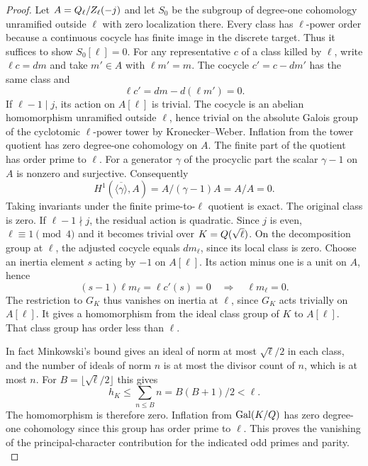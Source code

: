 \begin{proof}
Let \(A=Q_\ell/Z_\ell(-j)\) and
let \(S_0\) be the subgroup of degree-one cohomology
unramified outside \(\ell\) with zero localization there.
Every class has \(\ell\)-power order because a continuous
cocycle has finite image in the discrete target. Thus
it suffices to show \(S_0[\ell]=0\). For any representative \(c\) of a class killed by \(\ell\),
write \(\ell c=dm\) and take \(m'\in A\) with \(\ell m'=m\).
The cocycle \(c'=c-dm'\) has the same class and
\[
          \ell c'=dm-d(\ell m')=0.
\]
If \(\ell-1\mid j\), its action on \(A[\ell]\) is
trivial. The cocycle is an abelian homomorphism
unramified outside \(\ell\), hence trivial on the
absolute Galois group of the cyclotomic \(\ell\)-power
tower by Kronecker--Weber. Inflation from the tower
quotient has zero degree-one cohomology on \(A\).
The finite part of the quotient has order prime to \(\ell\).
For a generator \(\gamma\) of the procyclic part the scalar
\(\gamma-1\) on \(A\) is nonzero and surjective. Consequently
\[
 H^1(\overline{\langle\gamma\rangle},A)
 = A/(\gamma-1)A=A/A=0 .
\]
Taking invariants under the finite prime-to-\(\ell\) quotient is exact. The original
class is zero.
If \(\ell-1\nmid j\), the residual action is
quadratic. Since \(j\) is even, \(\ell\equiv1\pmod4\)
and it becomes trivial over \(K=Q(\sqrt\ell)\).
On the decomposition group at \(\ell\), the adjusted
cocycle equals \(dm_\ell\), since its local class
is zero. Choose an inertia element \(s\) acting by \(-1\) on \(A[\ell]\).
Its action minus one is a unit on \(A\), hence
\[
       (s-1)\ell m_\ell=\ell c'(s)=0\quad\Longrightarrow\quad
                  \ell m_\ell=0.
\]
The restriction to \(G_K\) thus vanishes on inertia at \(\ell\),
since \(G_K\) acts trivially on \(A[\ell]\). It gives a
homomorphism from the ideal class group of \(K\)
to \(A[\ell]\). That class group has order less
than \(\ell\).

In fact Minkowski's bound gives an
ideal of norm at most \(\sqrt\ell/2\) in each class,
and the number of ideals of norm \(n\) is at most
the divisor count of \(n\), which is at most \(n\).
For \(B=\lfloor\sqrt\ell/2\rfloor\) this gives
\[
          h_K\le \sum_{n\le B}n=B(B+1)/2<\ell.
\] The homomorphism is therefore zero.
Inflation from \(\operatorname{Gal}(K/Q)\)
has zero degree-one cohomology since this group
has order prime to \(\ell\). This proves the vanishing of the principal-character contribution for the indicated odd primes and parity.
\label{cor:cohomology-cohomology-2}
\end{proof}


